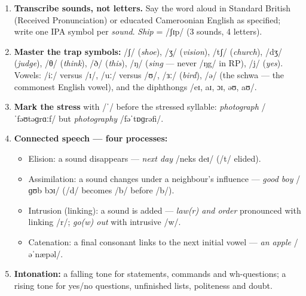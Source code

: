 \documentclass[11pt]{article}
\newcommand{\cle}[1]{{\popxbold\color{popdark}#1}}
\begin{document}
\begin{methode}
\begin{enumerate}
\item \textbf{Transcribe sounds, not letters.} Say the word aloud in Standard British (Received Pronunciation) or educated Cameroonian English as specified; write one IPA symbol per \emph{sound}. \emph{Ship} = /ʃɪp/ (3 sounds, 4 letters).
\item \textbf{Master the trap symbols:} /ʃ/ (\emph{shoe}), /ʒ/ (\emph{vision}), /tʃ/ (\emph{church}), /dʒ/ (\emph{judge}), /θ/ (\emph{think}), /ð/ (\emph{this}), /ŋ/ (\emph{sing} — never /ŋg/ in RP), /j/ (\emph{yes}). Vowels: /iː/ versus /ɪ/, /uː/ versus /ʊ/, /ɜː/ (\emph{bird}), /ə/ (the schwa — the commonest English vowel), and the diphthongs /eɪ, aɪ, ɔɪ, əʊ, aʊ/.
\item \textbf{Mark the stress} with /ˈ/ before the stressed syllable: \emph{photograph} /ˈfəʊtəɡrɑːf/ but \emph{photography} /fəˈtɒɡrəfi/.
\item \textbf{Connected speech — four processes:}
\begin{itemize}
\item \cle{Elision}: a sound disappears — \emph{next day} /neks deɪ/ (/t/ elided).
\item \cle{Assimilation}: a sound changes under a neighbour's influence — \emph{good boy} /ɡʊb bɔɪ/ (/d/ becomes /b/ before /b/).
\item \cle{Intrusion (linking)}: a sound is added — \emph{law(r) and order} pronounced with linking /r/; \emph{go(w) out} with intrusive /w/.
\item \cle{Catenation}: a final consonant links to the next initial vowel — \emph{an apple} /əˈnæpəl/.
\end{itemize}
\item \textbf{Intonation:} a falling tone for statements, commands and wh-questions; a rising tone for yes/no questions, unfinished lists, politeness and doubt.
\end{enumerate}
\end{methode}
\end{document}
